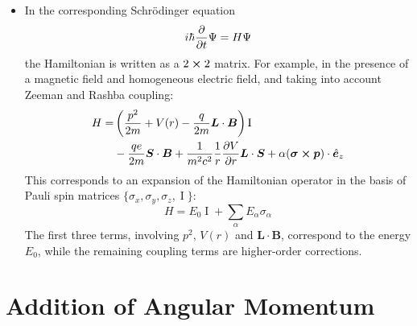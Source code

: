 \documentclass[11pt, a4paper]{article}
\newcommand{\Schro}{Schr\"{o}dinger\xspace}
\newcommand{\Ham}{Hamiltonian\xspace}
\renewcommand{\vec}[1]{\bm{#1}}  %
\newcommand{\uvec}[1]{\hat{\vec{#1}}}  %
\renewcommand{\L}{\vec{L}}  %
\renewcommand{\S}{\vec{S}}  %
\newcommand{\B}{\vec{B}}  %
\newcommand{\II}{\operatorname{I}}  %
\renewcommand{\P}{\Psi}  %
\begin{document}
\begin{itemize}
	\item In the corresponding \Schro equation
	\begin{equation*}
		i \hbar \pdv{t} \P = H \P
	\end{equation*}
	the \Ham is written as a $ 2 \cross 2 $ matrix. For example, in the presence of a magnetic field and homogeneous electric field, and taking into account Zeeman and Rashba coupling:
	\begin{align*}
		H = &\left(\frac{p^{2}}{2m} + V(r) - \frac{q}{2m}\L \cdot \B\right)\II\\
		& - \frac{qe}{2m}\S \cdot \B + \frac{1}{m^{2}c^{2}}\frac{1}{r}\pdv{V}{r} \L \cdot \S + \alpha (\vec{\sigma}\cross \vec{p})\cdot \uvec{e}_{z}
	\end{align*}
	This corresponds to an expansion of the \Ham operator in the basis of Pauli spin matrices $ \{\sigma_{x}, \sigma_{y}, \sigma_{z}, \II\} $:
	\begin{equation*}
		H = E_{0}\II + \sum_{\alpha}E_{\alpha}\sigma_{\alpha}
	\end{equation*}
	The first three terms, involving $ p^{2} $, $ V(r) $ and $ \L \cdot \B $, correspond to the energy $ E_{0} $, while the remaining coupling terms are higher-order corrections.
	
\end{itemize}


\newpage
\section{Addition of Angular Momentum}
\end{document}

